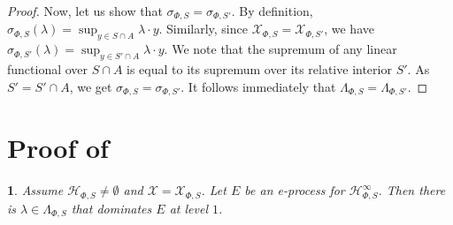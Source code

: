 \documentclass[10pt, a4paper]{article}
\newcommand{\Hh}{\mathcal H}
\newcommand{\HhP}{\Hh_{\Phi,S}}
\newcommand{\LP}{\Lambda_{\Phi,S}}
\newcommand{\sP}{\sigma_{\Phi,S}}
\newcommand{\X}{\mathcal X}
\newcommand{\XP}{\X_{\Phi,S}}
\newcommand{\reptile}{}
\newtheorem*{repinner}{\reptile}
\newenvironment{reflem}[1]{%
  \renewcommand{\reptile}{Lemma \ref{#1}}%
  \begin{repinner}
}{%
  \end{repinner}
}
\begin{document}
\begin{proof}
    Now, let us show that $\sP = \sigma_{\Phi,S'}$. By definition, $\sP(\lambda) = \sup_{y\in S\cap A}\lambda\cdot y$. Similarly, since $\XP = \X_{\Phi,S'}$, we have $\sigma_{\Phi,S'}(\lambda) = \sup_{y\in S'\cap A}\lambda\cdot y$. We note that the supremum of any linear functional over $S\cap A$ is equal to its supremum over its relative interior $S'$. As $S' = S'\cap A$, we get $\sP = \sigma_{\Phi,S'}$. It follows immediately that  $\LP = \Lambda_{\Phi,S'}$.
\end{proof}
    

\section[Proof of Lemma 4]{Proof of }\label{app:proof_dom}
\begin{reflem}{lemma:dom}
    Assume $\HhP\neq\emptyset$ and $\X=\XP$. Let $E$ be an e-process for $\HhP^\infty$. Then there is $\lambda\in\LP$ that dominates $E$ at level $1$.
\end{reflem}
\end{document}
